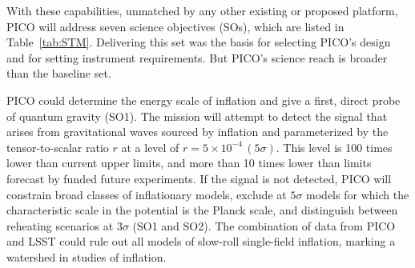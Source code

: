 \documentclass[PICOReport.tex]{subfiles}
\begin{document}

With these capabilities, unmatched by any other existing or proposed platform, PICO will address seven science objectives (SOs), which are listed in Table~\ref{tab:STM}. Delivering this set was the basis for selecting PICO's design and for setting instrument requirements. But PICO's science reach is broader than the baseline set. 


PICO could determine the energy scale of inflation and give a first, direct probe of quantum gravity (SO1). %
The mission will attempt to detect the signal that arises from gravitational waves sourced by inflation and parameterized by the tensor-to-scalar ratio $r$ at a level of $r =5\times10^{-4} \, (5\sigma)$. This level is 100 times lower than current upper limits, and more than 10 times lower than limits forecast by funded future experiments.  If the signal is not detected, PICO will constrain broad classes of inflationary models, exclude at $5 \sigma$ models for which the characteristic scale in the potential is the Planck scale, and distinguish between reheating scenarios at $3\sigma$ (SO1 and SO2). The combination of data from PICO and LSST could rule out all models of slow-roll single-field inflation, marking a watershed in studies of inflation. 
\end{document}
